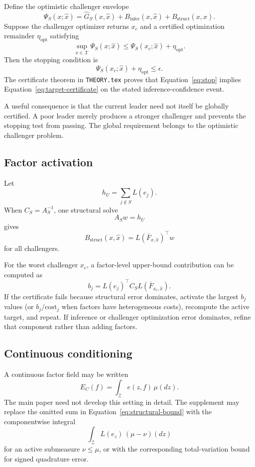 Define the optimistic challenger envelope
\begin{equation}
    \Psi_S(x;\widehat x)
    =
    \widehat G_S(x,\widehat x)
    + B_{\mathrm{infer}}(x,\widehat x)
    + B_{\mathrm{struct}}(x,\widehat x).
    \label{eq:challenger-envelope}
\end{equation}
Suppose the challenger optimizer returns $x_c$ and a certified optimization
remainder $\eta_{\mathrm{opt}}$ satisfying
\[
    \sup_{x\in\mathcal X}\Psi_S(x;\widehat x)
    \le \Psi_S(x_c;\widehat x)+\eta_{\mathrm{opt}}.
\]
Then the stopping condition is
\begin{equation}
    \Psi_S(x_c;\widehat x)+\eta_{\mathrm{opt}}\le\epsilon.
    \label{eq:stop}
\end{equation}
The certificate theorem in \texttt{THEORY.tex} proves that
Equation~\eqref{eq:stop} implies Equation~\eqref{eq:target-certificate} on the
stated inference-confidence event.

A useful consequence is that the current leader need not itself be globally
certified.  A poor leader merely produces a stronger challenger and prevents
the stopping test from passing.  The global requirement belongs to the
optimistic challenger problem.

\subsection{Factor activation}

Let
\[
    h_U=\sum_{j\notin S}L(e_j).
\]
When $C_S=A_S^{-1}$, one structural solve
\[
    A_S w=h_U
\]
gives
\[
    B_{\mathrm{struct}}(x,\widehat x)=L(\bar F_{x,\widehat x})^\top w
\]
for all challengers.

For the worst challenger $x_c$, a factor-level upper-bound contribution can be
computed as
\[
    b_j
    = L(e_j)^\top C_S L(\bar F_{x_c,\widehat x}).
\]
If the certificate fails because structural error dominates, activate the
largest $b_j$ values (or $b_j/\mathrm{cost}_j$ when factors have heterogeneous
costs), recompute the active target, and repeat.  If inference or challenger
optimization error dominates, refine that component rather than adding factors.

\subsection{Continuous conditioning}

A continuous factor field may be written
\[
    E_C(f)=\int_{\mathcal Z} e(z,f)\,\mu(dz).
\]
The main paper need not develop this setting in detail.  The supplement may
replace the omitted sum in Equation~\eqref{eq:structural-bound} with the
componentwise integral
\[
    \int_{\mathcal Z} L(e_z)\,(\mu-\nu)(dz)
\]
for an active submeasure $\nu\le\mu$, or with the corresponding total-variation
bound for signed quadrature error.

